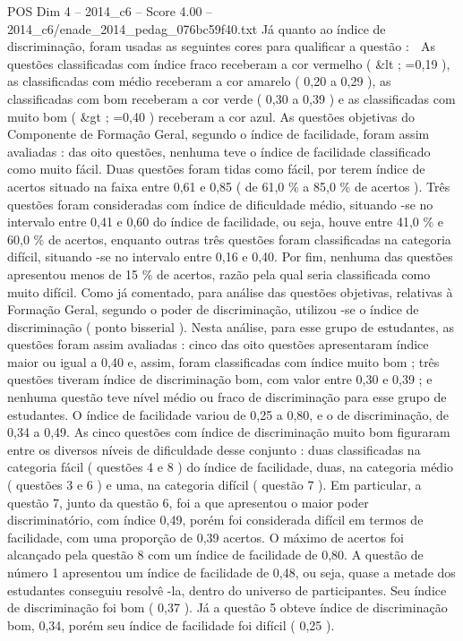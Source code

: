 \begin{textsample}{POS Dim 4 – 2014\_c6 – Score 4.00 – 2014\_c6/enade\_2014\_pedag\_076bc59f40.txt}
Já quanto ao índice de discriminação, foram usadas as seguintes cores para qualificar a questão :  As questões classificadas com índice fraco receberam a cor vermelho ( \&lt ; =0,19 ), as classificadas com médio receberam a cor amarelo ( 0,20 a 0,29 ), as classificadas com bom receberam a cor verde ( 0,30 a 0,39 ) e as classificadas com muito bom ( \&gt ; =0,40 ) receberam a cor azul.
As questões objetivas do Componente de Formação Geral, segundo o índice de facilidade, foram assim avaliadas : das oito questões, nenhuma teve o índice de facilidade classificado como muito fácil.
Duas questões foram tidas como fácil, por terem índice de acertos situado na faixa entre 0,61 e 0,85 ( de 61,0 \% a 85,0 \% de acertos ).
Três questões foram consideradas com índice de dificuldade médio, situando -se no intervalo entre 0,41 e 0,60 do índice de facilidade, ou seja, houve entre 41,0 \% e 60,0 \% de acertos, enquanto outras três questões foram classificadas na categoria difícil, situando -se no intervalo entre 0,16 e 0,40.
Por fim, nenhuma das questões apresentou menos de 15 \% de acertos, razão pela qual seria classificada como muito difícil.
Como já comentado, para análise das questões objetivas, relativas à Formação Geral, segundo o poder de discriminação, utilizou -se o índice de discriminação ( ponto bisserial ).
Nesta análise, para esse grupo de estudantes, as questões foram assim avaliadas : cinco das oito questões apresentaram índice maior ou igual a 0,40 e, assim, foram classificadas com índice muito bom ; três questões tiveram índice de discriminação bom, com valor entre 0,30 e 0,39 ; e nenhuma questão teve nível médio ou fraco de discriminação para esse grupo de estudantes.
O índice de facilidade variou de 0,25 a 0,80, e o de discriminação, de 0,34 a 0,49.
As cinco questões com índice de discriminação muito bom figuraram entre os diversos níveis de dificuldade desse conjunto : duas classificadas na categoria fácil ( questões 4 e 8 ) do índice de facilidade, duas, na categoria médio ( questões 3 e 6 ) e uma, na categoria difícil ( questão 7 ).
Em particular, a questão 7, junto da questão 6, foi a que apresentou o maior poder discriminatório, com índice 0,49, porém foi considerada difícil em termos de facilidade, com uma proporção de 0,39 acertos.
O máximo de acertos foi alcançado pela questão 8 com um índice de facilidade de 0,80.
A questão de número 1 apresentou um índice de facilidade de 0,48, ou seja, quase a metade dos estudantes conseguiu resolvê -la, dentro do universo de participantes.
Seu índice de discriminação foi bom ( 0,37 ).
Já a questão 5 obteve índice de discriminação bom, 0,34, porém seu índice de facilidade foi difícil ( 0,25 ).

\end{textsample}
